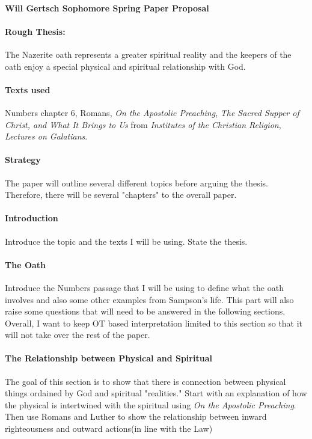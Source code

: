 \documentclass[12pt,a4paper]{article}
\author{Will}
\begin{document}
\paragraph{Will Gertsch Sophomore Spring Paper Proposal}
\paragraph{Rough Thesis:} The Nazerite oath represents a greater spiritual reality and the keepers of the oath enjoy a special physical and spiritual relationship with God.

\paragraph{Texts used} Numbers chapter 6, Romans, \textit{On the Apostolic Preaching}, \textit{The Sacred Supper of Christ, and What It Brings to Us} from \textit{Institutes of the Christian Religion}, \textit{Lectures on Galatians}.

\paragraph{Strategy} The paper will outline several different topics before arguing the thesis. Therefore, there will be several "chapters" to the overall paper.

\paragraph{Introduction} Introduce the topic and the texts I will be using. State the thesis.

\paragraph{The Oath} Introduce the Numbers passage that I will be using to define what the oath involves and also some other examples from Sampson's life. This part will also raise some questions that will need to be answered in the following sections.  Overall, I want to keep OT based interpretation limited to this section so that it will not take over the rest of the paper.

\paragraph{The Relationship between Physical and Spiritual}  The goal of this section is to show that there is connection between physical things ordained by God and spiritual "realities." Start with an explanation of how the physical is intertwined with the spiritual using \textit{On the Apostolic Preaching}. Then use Romans and Luther to show the relationship between inward righteousness and outward actions(in line with the Law)
\end{document}

